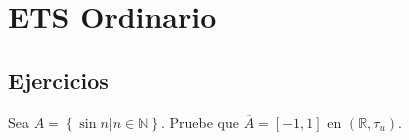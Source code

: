 \documentclass[12pt]{report}
\theoremstyle{largebreak}
\newcommand{\Cls}[1]{\ensuremath{\overline{#1}}}
\begin{document}
    \begin{excer}
        
    \end{excer}

    \chapter{ETS Ordinario}

    \section{Ejercicios}

    \begin{excer}
        Sea $A=\left\{\sin n\Big|n\in\mathbb{N} \right\}$. Pruebe que $\Cls{A}=[-1,1]$ en $(\mathbb{R},\tau_u)$.
    \end{excer}
\end{document}
